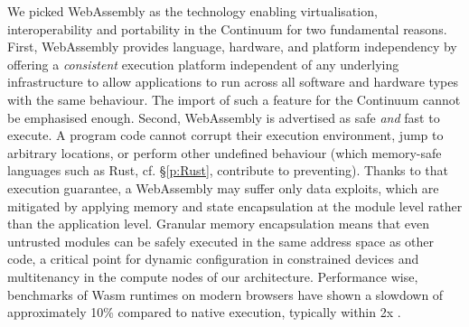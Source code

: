We picked WebAssembly as the technology enabling virtualisation, interoperability and portability in the Continuum for two fundamental reasons. 
First, WebAssembly provides language, hardware, and platform independency by offering a \textit{consistent} execution platform independent of any underlying infrastructure to allow applications to run across all software and hardware types with the same behaviour. The import of such a feature for the Continuum cannot be emphasised enough.
Second, WebAssembly is advertised as safe \textit{and} fast to execute. A program code cannot corrupt their execution environment, jump to arbitrary locations, or perform other undefined behaviour (which memory-safe languages such as Rust, cf. §\ref{p:Rust}, contribute to preventing).  Thanks to that execution guarantee, a WebAssembly may suffer only data exploits, which are mitigated by applying memory and state encapsulation at the module level rather than the application level.
Granular memory encapsulation means that even untrusted modules can be safely executed in the same address space as other code, a critical point for dynamic configuration in constrained devices and multitenancy in the compute nodes of our architecture. Performance wise, benchmarks of Wasm runtimes on modern browsers have shown a slowdown of approximately 10\% compared to native execution, typically within 2x \cite{haas2017bringing, wasm-continuum}.

